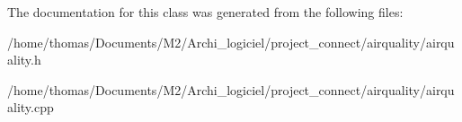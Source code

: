 The documentation for this class was generated from the following files\+:\begin{DoxyCompactItemize}
\item 
/home/thomas/\+Documents/\+M2/\+Archi\+\_\+logiciel/project\+\_\+connect/airquality/airquality.\+h\item 
/home/thomas/\+Documents/\+M2/\+Archi\+\_\+logiciel/project\+\_\+connect/airquality/airquality.\+cpp\end{DoxyCompactItemize}
